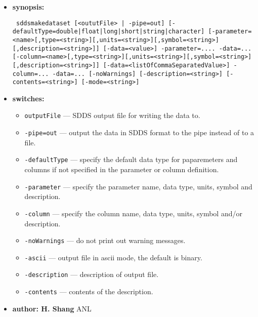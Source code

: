 \begin{itemize}
\item {\bf synopsis:} 
%
%
\begin{flushleft}{\tt
sddsmakedataset [<oututFile> | -pipe=out] 
[-defaultType={double|float|long|short|string|character}] [-parameter=<name>[,type=<string>][,units=<string>][,symbol=<string>][,description=<string>]]
[-data=<value>] -parameter=.... -data=...
[-column=<name>[,type=<string>][,units=<string>][,symbol=<string>][,description=<string>]]
[-data=<listOfCommaSeparatedValue>] -column=... -data=... 
[-noWarnings] [-description=<string>] [-contents=<string>] [-mode=<string>]        
}\end{flushleft}

\item {\bf switches:}
%
%
    \begin{itemize}
    \item {\tt  outputFile} --- SDDS output file for writing the data to.
    \item {\tt  -pipe=out}  --- output the data in SDDS format to the pipe instead of to a file.
    \item {\tt  -defaultType} --- specify the default data type for paparemeters and columns 
                                  if not specified in the parameter or column definition.
    \item {\tt  -parameter}   --- specify the parameter name, data type, units, 
                                  symbol and description.
    \item {\tt  -column} --- specify the column name, data type, units, symbol and/or description.
    \item {\tt  -noWarnings} --- do not print out warning messages.
    \item {\tt  -ascii} --- output file in ascii mode, the default is binary. 
    \item {\tt  -description} --- description of output file.
    \item {\tt  -contents} --- contents of the description.
    \end{itemize}

%
%
%
%
\item {\bf author: H. Shang } ANL
\end{itemize}



